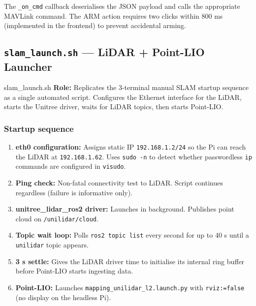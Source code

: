 \documentclass[11pt,a4paper]{article}
\begin{document}
The \texttt{\_on\_cmd} callback deserialises the JSON payload and calls the
appropriate MAVLink command. The ARM action requires two clicks within 800 ms
(implemented in the frontend) to prevent accidental arming.

\subsection{\texttt{slam\_launch.sh} — LiDAR + Point-LIO Launcher}

\begin{filebox}{slam\_launch.sh}
\textbf{Role:} Replicates the 3-terminal manual SLAM startup sequence as a
single automated script. Configures the Ethernet interface for the LiDAR,
starts the Unitree driver, waits for LiDAR topics, then starts Point-LIO.
\end{filebox}

\subsubsection{Startup sequence}

\begin{enumerate}
  \item \textbf{eth0 configuration:} Assigns static IP \texttt{192.168.1.2/24}
        so the Pi can reach the LiDAR at \texttt{192.168.1.62}. Uses
        \texttt{sudo -n} to detect whether passwordless \texttt{ip} commands
        are configured in \texttt{visudo}.
  \item \textbf{Ping check:} Non-fatal connectivity test to LiDAR. Script
        continues regardless (failure is informative only).
  \item \textbf{unitree\_lidar\_ros2 driver:} Launches in background. Publishes
        point cloud on \texttt{/unilidar/cloud}.
  \item \textbf{Topic wait loop:} Polls \texttt{ros2 topic list} every second
        for up to 40 s until a \texttt{unilidar} topic appears.
  \item \textbf{3 s settle:} Gives the LiDAR driver time to initialise its
        internal ring buffer before Point-LIO starts ingesting data.
  \item \textbf{Point-LIO:} Launches \texttt{mapping\_unilidar\_l2.launch.py}
        with \texttt{rviz:=false} (no display on the headless Pi).
\end{enumerate}
\end{document}
